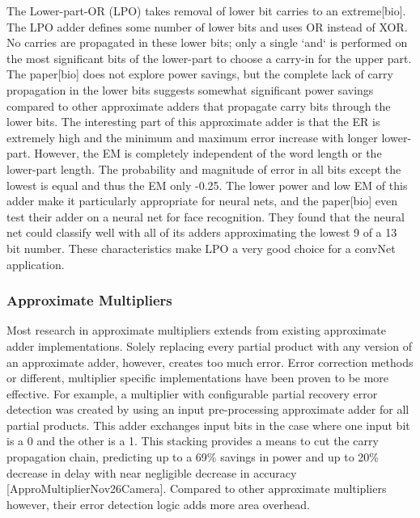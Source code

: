 \documentclass[conference]{IEEEtran}
\begin{document}
	\indent The Lower-part-OR (LPO) takes removal of lower bit carries to an extreme[bio]. The LPO adder defines some number of lower bits and uses OR instead of XOR. No carries are propagated in these lower bits; only a single `and` is performed on the most significant bits of the lower-part to choose a carry-in for the upper part. The paper[bio] does not explore power savings, but the complete lack of carry propagation in the lower bits suggests somewhat significant power savings compared to other approximate adders that propagate carry bits through the lower bits. The interesting part of this approximate adder is that the ER is extremely high and the minimum and maximum error increase with longer lower-part. However, the EM is completely independent of the word length or the lower-part length. The probability and magnitude of error in all bits except the lowest is equal and thus the EM only -0.25. The lower power and low EM of this adder make it particularly appropriate for neural nets, and the paper[bio] even test their adder on a neural net for face recognition. They found that the neural net could classify well with all of its adders approximating the lowest 9 of a 13 bit number. These characteristics make LPO a very good choice for a convNet application.\\
	  
	\subsubsection{Approximate Multipliers}
	\indent Most research in approximate multipliers extends from existing approximate adder implementations. Solely replacing every partial product with any version of an approximate adder, however, creates too much error. Error correction methods or different, multiplier specific implementations have been proven to be more effective. For example, a multiplier with configurable partial recovery error detection was created by using an input pre-processing approximate adder for all partial products. This adder exchanges input bits in the case where one input bit is a 0 and the other is a 1. This stacking provides a means to cut the carry propagation chain, predicting up to a 69\% savings in power and up to 20\% decrease in delay with near negligible decrease in accuracy  [ApproMultiplierNov26Camera]. Compared to other approximate multipliers however, their error detection logic adds more area overhead.\\
	
\end{document}
